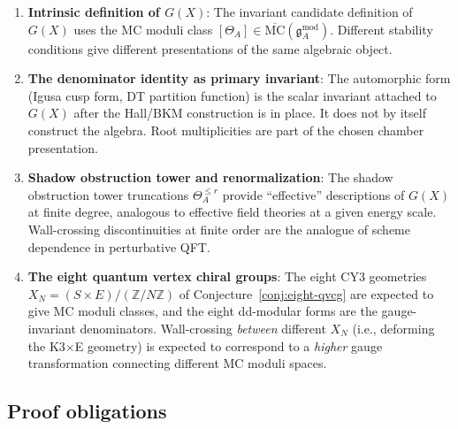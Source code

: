 \documentclass[11pt]{article}
\theoremstyle{definition}
\theoremstyle{remark}
\newcommand{\frakg}{\mathfrak{g}}
\newcommand{\MC}{\mathrm{MC}}
\begin{document}
\begin{enumerate}[label=(\arabic*)]
\item \textbf{Intrinsic definition of $G(X)$}: The invariant candidate
 definition of $G(X)$ uses the MC moduli class
 $[\Theta_A] \in \overline{\MC}(\frakg^{\mathrm{mod}}_A)$. Different
 stability conditions give different presentations of the same
 algebraic object.

\item \textbf{The denominator identity as primary invariant}: The
 automorphic form (Igusa cusp form, DT partition function) is the
 scalar invariant attached to $G(X)$ after the Hall/BKM construction is
 in place. It does not by itself construct the algebra. Root
 multiplicities are part of the chosen chamber presentation.

\item \textbf{Shadow obstruction tower and renormalization}: The shadow obstruction tower
 truncations $\Theta^{\leq r}_A$ provide ``effective'' descriptions of
 $G(X)$ at finite degree, analogous to effective field theories at a
 given energy scale. Wall-crossing discontinuities at finite order are
 the analogue of scheme dependence in perturbative QFT.

\item \textbf{The eight quantum vertex chiral groups}: The eight
 CY3 geometries $X_N = (S \times E)/(\mathbb{Z}/N\mathbb{Z})$ of
 Conjecture~\ref*{conj:eight-qvcg} are expected to give MC moduli classes,
 and the eight dd-modular forms are the gauge-invariant denominators.
 Wall-crossing \emph{between} different $X_N$ (i.e., deforming the
 K3$\times$E geometry) is expected to correspond to a \emph{higher} gauge
 transformation connecting different MC moduli spaces.
\end{enumerate}

\subsection{Proof obligations}
\label{ssec:wc-open}
\end{document}

